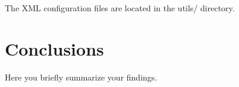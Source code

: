 \documentclass[letterpaper,12pt]{article}
\begin{document}
The XML configuration files are located in the utils/ directory.


\section{Conclusions}
Here you briefly summarize your findings.


\begin{thebibliography}{99}


\end{thebibliography}
\end{document}
